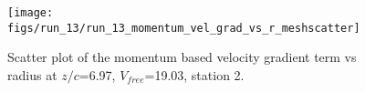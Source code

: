 \begin{figure}[H]
\centering
\texttt{[image: figs/run\_13/run\_13\_momentum\_vel\_grad\_vs\_r\_meshscatter]}
\caption{Scatter plot of the momentum based velocity gradient term vs radius at $z/c$=6.97, $V_{free}$=19.03, station 2.}
\label{fig:run_13_momentum_vel_grad_vs_r_meshscatter}
\end{figure}



